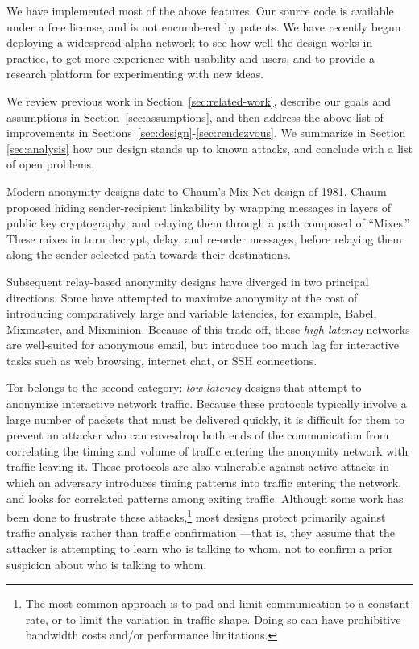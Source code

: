 \documentclass[times,10pt,twocolumn]{article}
\begin{document}
We have implemented most of the above features. Our source code is
available under a free license, and is not encumbered by patents. We have
recently begun deploying a widespread alpha network to see how well the
design works in practice, to get more experience with usability and users,
and to provide a research platform for experimenting with new ideas.

We review previous work in Section~\ref{sec:related-work}, describe
our goals and assumptions in Section~\ref{sec:assumptions},
and then address the above list of improvements in
Sections~\ref{sec:design}-\ref{sec:rendezvous}. We
summarize in Section \ref{sec:analysis}
how our design stands up to known attacks, and conclude with a list of
open problems.


\label{sec:related-work}

Modern anonymity designs date to Chaum's Mix-Net\cite{chaum-mix} design of
1981.  Chaum proposed hiding sender-recipient linkability by wrapping
messages in layers of public key cryptography, and relaying them
through a path composed of ``Mixes.''  These mixes in turn decrypt, delay,
and re-order messages, before relaying them along the sender-selected
path towards their destinations.

Subsequent relay-based anonymity designs have diverged in two
principal directions.  Some have attempted to maximize anonymity at
the cost of introducing comparatively large and variable latencies,
for example, Babel\cite{babel}, Mixmaster\cite{mixmaster-spec}, and
Mixminion\cite{minion-design}.  Because of this
trade-off, these \emph{high-latency} networks are well-suited for anonymous
email, but introduce too much lag for interactive tasks such as web browsing,
internet chat, or SSH connections.

Tor belongs to the second category: \emph{low-latency} designs that attempt
to anonymize interactive network traffic.  Because these protocols typically
involve a large number of packets that must be delivered quickly, it is
difficult for them to prevent an attacker who can eavesdrop both ends of the
communication from correlating the timing and volume
of traffic entering the anonymity network with traffic leaving it.  These
protocols are also vulnerable against active attacks in which an
adversary introduces timing patterns into traffic entering the network, and 
looks
for correlated patterns among exiting traffic.
Although some work has been done to frustrate
these attacks,\footnote{
  The most common approach is to pad and limit communication to a constant
  rate, or to limit
  the variation in traffic shape.  Doing so can have prohibitive bandwidth
  costs and/or performance limitations.
} most designs protect primarily against traffic analysis rather than traffic
confirmation \cite{or-jsac98}---that is, they assume that the attacker is
attempting to learn who is talking to whom, not to confirm a prior suspicion
about who is talking to whom.
\end{document}
